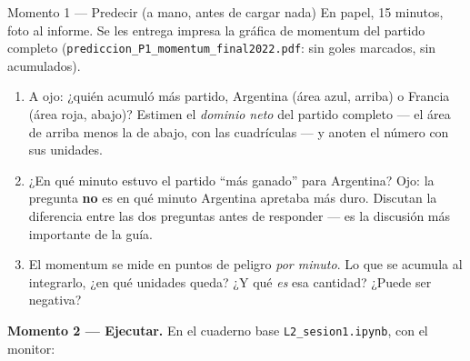 \documentclass[12pt,letterpaper]{article}
\begin{document}
\begin{cajaprediccion}{Momento 1 --- Predecir (a mano, antes de cargar nada)}
En papel, 15 minutos, foto al informe. Se les entrega impresa la gráfica de momentum del partido completo (\texttt{prediccion\_P1\_momentum\_final2022.pdf}: sin goles marcados, sin acumulados).
\begin{enumerate}[label=P\arabic*., itemsep=0.1em]
    \item A ojo: ¿quién acumuló más partido, Argentina (área azul, arriba) o Francia (área roja, abajo)? Estimen el \emph{dominio neto} del partido completo --- el área de arriba menos la de abajo, con las cuadrículas --- y anoten el número con sus unidades.
    \item ¿En qué minuto estuvo el partido ``más ganado'' para Argentina? Ojo: la pregunta \textbf{no} es en qué minuto Argentina apretaba más duro. Discutan la diferencia entre las dos preguntas antes de responder --- es la discusión más importante de la guía.
    \item El momentum se mide en puntos de peligro \emph{por minuto}. Lo que se acumula al integrarlo, ¿en qué unidades queda? ¿Y qué \emph{es} esa cantidad? ¿Puede ser negativa?
\end{enumerate}
\end{cajaprediccion}

\textbf{Momento 2 --- Ejecutar.} En el cuaderno base \texttt{L2\_sesion1.ipynb}, con el monitor:
\end{document}
